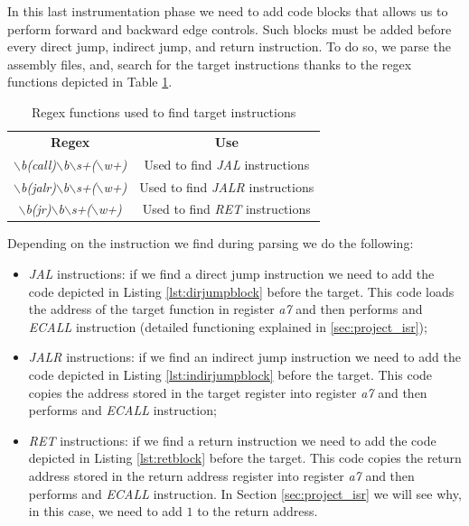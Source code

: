In this last instrumentation phase we need to add code blocks that allows us to
perform forward and backward edge controls. Such blocks must be added before every
direct jump, indirect jump, and return instruction. To do so, we parse the assembly
files, and, search for the target instructions thanks to the regex functions depicted
in Table \ref{tab:regexes}.

\begin{table}
  \centering
  \begin{tabular}{|c|c|}
    \hline
    \textbf{Regex}                                                                      & \textbf{Use}                            \\
    \hhline{==} \textit{$\backslash$b(call)$\backslash$b$\backslash$s+($\backslash$w+)} & Used to find \textit{JAL} instructions  \\
    \hline
    \textit{$\backslash$b(jalr)$\backslash$b$\backslash$s+($\backslash$w+)}             & Used to find \textit{JALR} instructions \\
    \hline
    \textit{$\backslash$b(jr)$\backslash$b$\backslash$s+($\backslash$w+)}               & Used to find \textit{RET} instructions  \\
    \hline
  \end{tabular}
  \caption{Regex functions used to find target instructions}
  \label{tab:regexes}
\end{table}

Depending on the instruction we find during parsing we do the following:
\begin{itemize}
  \item \textit{JAL} instructions: if we find a direct jump instruction we need to
    add the code depicted in Listing \ref{lst:dirjumpblock} before the target.
    This code loads the address of the target function in register \textit{a7} and
    then performs and \textit{ECALL} instruction (detailed functioning explained
    in \ref{sec:project_isr});

  \item \textit{JALR} instructions: if we find an indirect jump instruction we need
    to add the code depicted in Listing \ref{lst:indirjumpblock} before the target.
    This code copies the address stored in the target register into register
    \textit{a7} and then performs and \textit{ECALL} instruction;

  \item \textit{RET} instructions: if we find a return instruction we need to add
    the code depicted in Listing \ref{lst:retblock} before the target. This code
    copies the return address stored in the return address register into
    register \textit{a7} and then performs and \textit{ECALL} instruction. In Section
    \ref{sec:project_isr} we will see why, in this case, we need to add $1$ to the
    return address.
\end{itemize}

